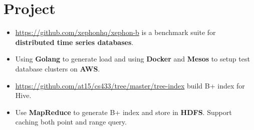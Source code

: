 \documentclass[10pt, letterpaper]{simple-cv}
\begin{document}
\section{Project}

\begin{itemize}
\item \url{https://github.com/xephonhq/xephon-b} is a benchmark suite for \textbf{distributed time series databases}.
\item Using \textbf{Golang} to generate load and using \textbf{Docker} and \textbf{Mesos} to setup test database clusters on \textbf{AWS}.
\end{itemize}

\begin{itemize}
\item \url{https://github.com/at15/cs433/tree/master/tree-index} build B+ index for Hive.
\item Use \textbf{MapReduce} to generate B+ index and store in \textbf{HDFS}. Support caching both point and range query.
\end{itemize}
\end{document}

